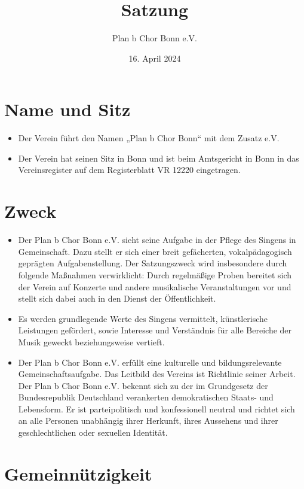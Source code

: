 \documentclass[12pt,paper=a4,ngerman]{report}
\title{\textbf{Satzung}}
\author{Plan b Chor Bonn e.V.}
\date{16. April 2024}
\begin{document}
\maketitle

\tableofcontents

\section{Name und Sitz}

\begin{itemize}
    \item Der Verein führt den Namen „Plan b Chor Bonn“ mit dem Zusatz e.V.
    \item Der Verein hat seinen Sitz in Bonn und ist beim Amtsgericht in Bonn in das Vereinsregister auf dem Registerblatt VR 12220 eingetragen.
\end{itemize}

\section{Zweck}

\begin{itemize}
    \item Der Plan b Chor Bonn e.V. sieht seine Aufgabe in der Pflege des Singens in Gemeinschaft. Dazu stellt er sich einer breit gefächerten, vokalpädagogisch geprägten Aufgabenstellung. Der Satzungszweck wird insbesondere durch folgende Maßnahmen verwirklicht: Durch regelmäßige Proben bereitet sich der Verein auf Konzerte und andere musikalische Veranstaltungen vor und stellt sich dabei auch in den Dienst der Öffentlichkeit.
    \item Es werden grundlegende Werte des Singens vermittelt, künstlerische Leistungen gefördert, sowie Interesse und Verständnis für alle Bereiche der Musik geweckt beziehungsweise vertieft.
    \item Der Plan b Chor Bonn e.V. erfüllt eine kulturelle und bildungsrelevante Gemeinschaftsaufgabe. Das Leitbild des Vereins ist Richtlinie seiner Arbeit. Der Plan b Chor Bonn e.V. bekennt sich zu der im Grundgesetz der Bundesrepublik Deutschland verankerten demokratischen Staats- und Lebensform. Er ist parteipolitisch und konfessionell neutral und richtet sich an alle Personen unabhängig ihrer Herkunft, ihres Aussehens und ihrer geschlechtlichen oder sexuellen Identität.
\end{itemize}

\section{Gemeinnützigkeit}
\end{document}
